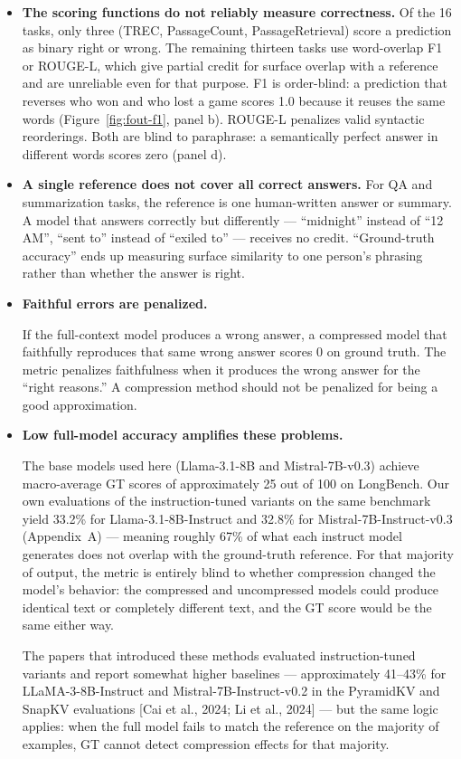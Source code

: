 \documentclass[10pt,letterpaper]{article}
\begin{document}
\begin{itemize}
\item
  \textbf{The scoring functions do not reliably measure correctness.}
  Of the 16 tasks, only three (TREC, PassageCount, PassageRetrieval)
  score a prediction as binary right or wrong. The remaining thirteen
  tasks use word-overlap F1 or ROUGE-L, which give partial credit for
  surface overlap with a reference and are unreliable even for that
  purpose. F1 is order-blind: a prediction that reverses who won and
  who lost a game scores 1.0 because it reuses the same words
  (Figure~\ref{fig:fout-f1}, panel b). ROUGE-L penalizes valid
  syntactic reorderings. Both are blind to paraphrase: a semantically
  perfect answer in different words scores zero (panel d).

\item
  \textbf{A single reference does not cover all correct answers.}
  For QA and summarization tasks, the reference is one human-written
  answer or summary. A model that answers correctly but differently ---
  ``midnight'' instead of ``12\,AM'', ``sent to'' instead of ``exiled
  to'' --- receives no credit. ``Ground-truth accuracy'' ends up
  measuring surface similarity to one person's phrasing rather than
  whether the answer is right.

\item
  \textbf{Faithful errors are penalized.}

  If the full-context model
  produces a wrong answer, a compressed model that faithfully reproduces
  that same wrong answer scores 0 on ground truth. The metric penalizes
  faithfulness when it produces the wrong answer for the ``right
  reasons.'' A compression method should not be penalized for being a
  good approximation.

\item
  \textbf{Low full-model accuracy amplifies these problems.}

  The base models used here (Llama-3.1-8B and Mistral-7B-v0.3) achieve
  macro-average GT scores of approximately 25 out of 100 on LongBench.
  Our own evaluations of the instruction-tuned variants on the same
  benchmark yield 33.2\% for Llama-3.1-8B-Instruct and 32.8\% for
  Mistral-7B-Instruct-v0.3 (Appendix~A) --- meaning roughly 67\% of what
  each instruct model generates does not overlap with the ground-truth
  reference. For that majority of output, the metric is entirely blind
  to whether compression changed the model's behavior: the compressed
  and uncompressed models could produce identical text or completely
  different text, and the GT score would be the same either way.

  The papers that introduced these methods evaluated instruction-tuned
  variants and report somewhat higher baselines --- approximately 41--43\%
  for LLaMA-3-8B-Instruct and Mistral-7B-Instruct-v0.2 in the PyramidKV
  and SnapKV evaluations {[}Cai et al., 2024; Li et al., 2024{]} --- but
  the same logic applies: when the full model fails to match the reference
  on the majority of examples, GT cannot detect compression effects for
  that majority.

\end{itemize}
\end{document}
